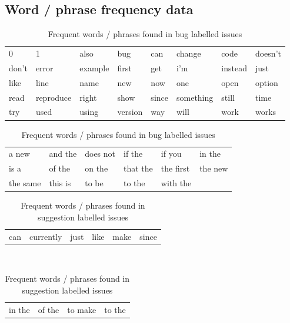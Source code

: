 \documentclass{article}
\begin{document}
\begin{appendices}
\section{Word / phrase frequency data}
\label{app:wordfreq}
\begin{table}[h]
\centering
\begin{tabular}{llllllll}
0         &
1         &
also      &
bug       &
can       &
change    &
code      &
doesn't   \\
don't     &
error     &
example   &
first     &
get       &
i'm       &
instead   &
just      \\
like      &
line      &
name      &
new       &
now       &
one       &
open      &
option    \\
read      &
reproduce &
right     &
show      &
since     &
something &
still     &
time      \\
try       &
used      &
using     &
version   &
way       &
will      &
work      &
works     
\end{tabular}
\newline\vspace{2mm}\newline
\begin{tabular}{llllll}
a new     &
and the   &
does not  &
if the    &
if you    &
in the    \\
is a      &
of the    &
on the    &
that the  &
the first &
the new   \\
the same  &
this is   &
to be     &
to the    &
with the  
\end{tabular}
\caption{Frequent words / phrases found in bug labelled issues}
\label{tab:wordfreq_bug}
\end{table}

\begin{table}[h]
\centering
\begin{tabular}{llllll}
can       &
currently &
just      &
like      &
make      &
since     
\end{tabular}
\\
\begin{tabular}{llll}
in the  &
of the  &
to make &
to the  
\end{tabular}
\caption{Frequent words / phrases found in suggestion labelled issues}
\label{tab:wordfreq_suggestion}
\end{table}

\end{appendices}
\end{document}
